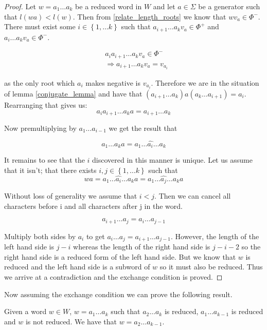 \documentclass[a4paper,12pt]{article}
\begin{document}
\begin{proof}
	Let $w = a_1 \ldots a_k$ be a reduced word in $W$ and let $a \in \Sigma$ be a generator such that $l(wa) < l(w)$. Then from \ref{relate_length_roots} we know that $wv_a \in \Phi^-$. There must exist some $i \in \left\{1, \ldots k\right\}$ such that $a_{i+1} \ldots a_kv_a \in \Phi^+$ and $a_i \ldots a_kv_a \in \Phi^-$. 
	
	\begin{align*}
		&a_i a_{i+1}\ldots a_kv_a \in \Phi^- \\
		&\Rightarrow a_{i+1} \ldots a_kv_a = v_{a_i}
	\end{align*}
	
	as the only root which $a_i$ makes negative is $v_{a_i}$. Therefore we are in the situation of lemma \ref{conjugate_lemma} and have that $(a_{i+1} \ldots a_k)a(a_k \ldots a_{i+1}) = a_i$. Rearranging that gives us:
	\[a_ia_{i+1} \ldots a_ka = a_{i+1} \ldots a_k\]
	
	Now premultiplying by $a_1 \ldots a_{i-1}$ we get the result that
	
	\[a_1 \ldots a_ka = a_1 \ldots \hat{a_i} \ldots a_k\]
	
	It remains to see that the $i$ discovered in this manner is unique. Let us assume that it isn't; that there exists $i, j \in \left\{1, \ldots k\right\}$ such that 
	\[wa = a_1 \ldots \hat{a_i} \ldots a_ka = a_1 \ldots \hat{a_j} \ldots a_ka\]
	
	Without loss of generality we assume that $i < j$. Then we can cancel all characters before i and all characters after j in the word.
	
	\[a_{i+1} \ldots a_j = a_i \ldots a_{j-1}\]
	
	Multiply both sides by $a_i$ to get $a_i \ldots a_j = a_{i+1} \ldots a_{j-1}$. However, the length of the left hand side is $j-i$ whereas the length of the right hand side is $j-i-2$ so the right hand side is a reduced form of the left hand side. But we know that $w$ is reduced and the left hand side is a subword of $w$ so it must also be reduced. Thus we arrive at a contradiction and the exchange condition is proved.
\end{proof}

Now assuming the exchange condition we can prove the following result.

\begin{cor}
	Given a word $w \in W$, $w = a_1 \ldots a_k$ such that $a_2 \ldots a_k$ is reduced, $a_1 \ldots a_{k-1}$ is reduced and $w$ is not reduced. We have that $w = a_2 \ldots a_{k-1}$.
\end{cor}
\end{document}
